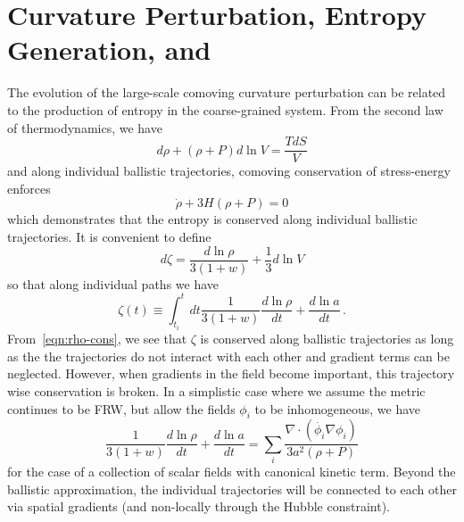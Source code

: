 \section{Curvature Perturbation, Entropy Generation, and }
The evolution of the large-scale comoving curvature perturbation can be related to the production of entropy in the coarse-grained system.
From the second law of thermodynamics, we have
\begin{equation}
  d\rho + (\rho+P)d\ln V = \frac{TdS}{V}
\end{equation}
and along individual ballistic trajectories, comoving conservation of stress-energy enforces
\begin{equation}\label{eqn:rho-cons}
  \dot{\rho} + 3H(\rho+P) = 0
\end{equation}
which demonstrates that the entropy is conserved along individual ballistic trajectories.
It is convenient to define
\begin{equation}
  d\zeta = \frac{d\ln\rho}{3(1+w)} + \frac{1}{3}d\ln V
\end{equation}
so that along individual paths we have
\begin{equation}
  \zeta(t) \equiv \int_{t_i}^t dt \frac{1}{3(1+w)}\frac{d\ln\rho}{dt} + \frac{d\ln a}{dt} \, .
\end{equation}
From~\eqref{eqn:rho-cons}, we see that $\zeta$ is conserved along ballistic trajectories as long as the the trajectories do not interact with each other and gradient terms can be neglected.
However, when gradients in the field become important, this trajectory wise conservation is broken.
In a simplistic case where we assume the metric continues to be FRW, but allow the fields $\phi_i$ to be inhomogeneous, we have
\begin{equation}
  \frac{1}{3(1+w)}\frac{d\ln\rho}{dt} + \frac{d\ln a}{dt} = \sum_i\frac{\nabla\cdot(\dot{\phi_i}\nabla\phi_i)}{3a^2(\rho+P)}
\end{equation}
for the case of a collection of scalar fields with canonical kinetic term.
Beyond the ballistic approximation, the individual trajectories will be connected to each other via spatial gradients (and non-locally through the Hubble constraint).

